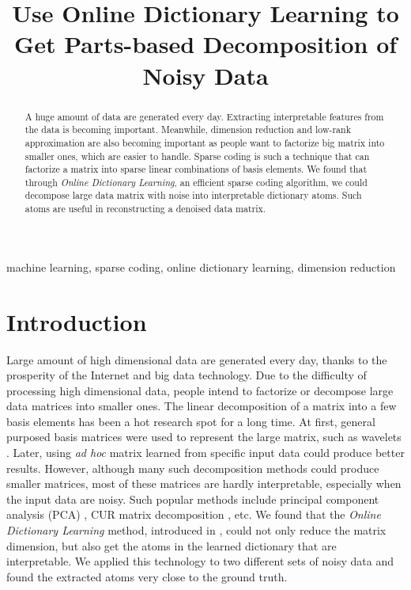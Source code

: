 \documentclass[conference]{IEEEtran}
\begin{document}
\title{Use Online Dictionary Learning to Get Parts-based Decomposition of Noisy Data}

\author{
}

\maketitle

\begin{abstract}
A huge amount of data are generated every day.
Extracting interpretable features from the data is becoming
important. Meanwhile, dimension reduction and low-rank approximation
are also becoming important as people want to
factorize big matrix into smaller ones, which are easier to handle.
Sparse coding is such a technique that can factorize a matrix into
sparse linear combinations of basis elements. We found that
through \textit{Online Dictionary Learning}, an efficient sparse coding
algorithm, we could decompose large data matrix with noise
into interpretable dictionary atoms. Such atoms are useful in
reconstructing a denoised data matrix.
\end{abstract}

\begin{IEEEkeywords}
machine learning, sparse coding, online dictionary learning, dimension reduction
\end{IEEEkeywords}

\section{Introduction}
Large amount of high dimensional data are generated every day, thanks to the prosperity of the Internet and big data technology. Due to the difficulty of processing high dimensional data, people intend to factorize or decompose large data matrices into smaller ones. The linear decomposition of a matrix into a few basis elements has been a hot research spot for a long time. At first, general purposed basis matrices were used to represent the large matrix, such as wavelets \cite{b1}. Later, using \textit{ad hoc} matrix learned from specific input data could produce better results. However, although many such decomposition methods could produce smaller matrices, most of these matrices are hardly interpretable, especially when the input data are noisy. Such popular methods include principal component analysis (PCA) \cite{b2}, CUR matrix decomposition \cite{b3}, etc. We found that the \textit{Online Dictionary Learning} method, introduced in \cite{b4}, could not only reduce the matrix dimension, but also get the atoms in the learned dictionary that are interpretable. We applied this technology to two different sets of noisy data and found the extracted atoms very close to the ground truth.
\end{document}
